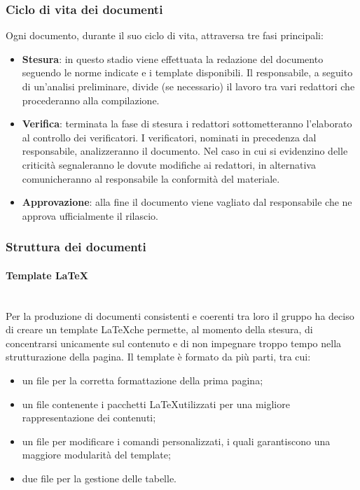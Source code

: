         \subsubsection{Ciclo di vita dei documenti}
            Ogni documento, durante il suo ciclo di vita, attraversa tre fasi principali:
            \begin{itemize}
                \item \textbf{Stesura}: in questo stadio viene effettuata la redazione del documento seguendo le norme indicate e i template disponibili.
                                        Il responsabile, a seguito di un'analisi preliminare, divide (se necessario) il lavoro tra vari redattori che procederanno
                                        alla compilazione.
                \item \textbf{Verifica}: terminata la fase di stesura i redattori sottometteranno l'elaborato al controllo dei verificatori. I verificatori, 
                                         nominati in precedenza dal responsabile, analizzeranno il documento. Nel caso in cui si evidenzino delle criticità
                                         segnaleranno le dovute modifiche ai redattori, in alternativa comunicheranno al responsabile la conformità del materiale.
                \item \textbf{Approvazione}: alla fine il documento viene vagliato dal responsabile che ne approva ufficialmente il rilascio.
            \end{itemize}
        \subsubsection{Struttura dei documenti}
            \paragraph{Template \LaTeX}\mbox{}\\ [1mm]
                Per la produzione di documenti consistenti e coerenti tra loro il gruppo ha deciso di creare un template \LaTeX che permette, al momento della
                stesura, di concentrarsi unicamente sul contenuto e di non impegnare troppo tempo nella strutturazione della pagina. Il template è formato da
                più parti, tra cui:
                \begin{itemize}
                    \item un file per la corretta formattazione della prima pagina;
                    \item un file contenente i pacchetti \LaTeX utilizzati per una migliore rappresentazione dei contenuti;
                    \item un file per modificare i comandi personalizzati, i quali garantiscono una maggiore modularità del template;
                    \item due file per la gestione delle tabelle.
                \end{itemize}
